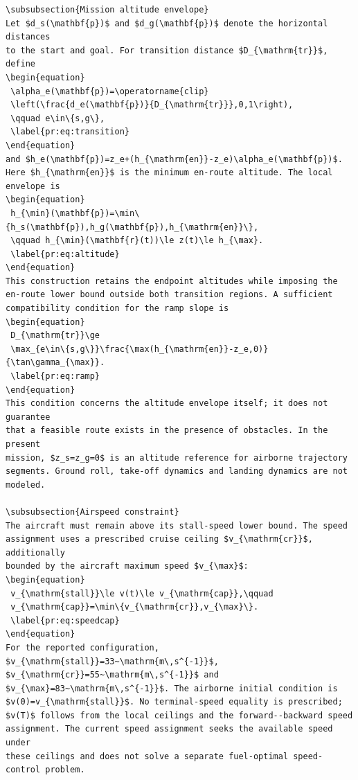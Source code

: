 \documentclass[12pt]{article}
\begin{document}
\begin{verbatim}
\subsubsection{Mission altitude envelope}
Let $d_s(\mathbf{p})$ and $d_g(\mathbf{p})$ denote the horizontal distances
to the start and goal. For transition distance $D_{\mathrm{tr}}$, define
\begin{equation}
 \alpha_e(\mathbf{p})=\operatorname{clip}
 \left(\frac{d_e(\mathbf{p})}{D_{\mathrm{tr}}},0,1\right),
 \qquad e\in\{s,g\},
 \label{pr:eq:transition}
\end{equation}
and $h_e(\mathbf{p})=z_e+(h_{\mathrm{en}}-z_e)\alpha_e(\mathbf{p})$.
Here $h_{\mathrm{en}}$ is the minimum en-route altitude. The local envelope is
\begin{equation}
 h_{\min}(\mathbf{p})=\min\{h_s(\mathbf{p}),h_g(\mathbf{p}),h_{\mathrm{en}}\},
 \qquad h_{\min}(\mathbf{r}(t))\le z(t)\le h_{\max}.
 \label{pr:eq:altitude}
\end{equation}
This construction retains the endpoint altitudes while imposing the
en-route lower bound outside both transition regions. A sufficient
compatibility condition for the ramp slope is
\begin{equation}
 D_{\mathrm{tr}}\ge
 \max_{e\in\{s,g\}}\frac{\max(h_{\mathrm{en}}-z_e,0)}{\tan\gamma_{\max}}.
 \label{pr:eq:ramp}
\end{equation}
This condition concerns the altitude envelope itself; it does not guarantee
that a feasible route exists in the presence of obstacles. In the present
mission, $z_s=z_g=0$ is an altitude reference for airborne trajectory
segments. Ground roll, take-off dynamics and landing dynamics are not modeled.

\subsubsection{Airspeed constraint}
The aircraft must remain above its stall-speed lower bound. The speed
assignment uses a prescribed cruise ceiling $v_{\mathrm{cr}}$, additionally
bounded by the aircraft maximum speed $v_{\max}$:
\begin{equation}
 v_{\mathrm{stall}}\le v(t)\le v_{\mathrm{cap}},\qquad
 v_{\mathrm{cap}}=\min\{v_{\mathrm{cr}},v_{\max}\}.
 \label{pr:eq:speedcap}
\end{equation}
For the reported configuration, $v_{\mathrm{stall}}=33~\mathrm{m\,s^{-1}}$,
$v_{\mathrm{cr}}=55~\mathrm{m\,s^{-1}}$ and
$v_{\max}=83~\mathrm{m\,s^{-1}}$. The airborne initial condition is
$v(0)=v_{\mathrm{stall}}$. No terminal-speed equality is prescribed;
$v(T)$ follows from the local ceilings and the forward--backward speed
assignment. The current speed assignment seeks the available speed under
these ceilings and does not solve a separate fuel-optimal speed-control problem.


\end{verbatim}
\end{document}
